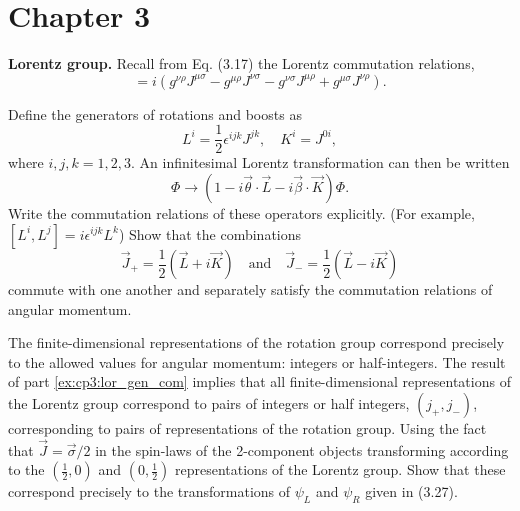 \section{Chapter 3}

\setcounter{equation}{150}
\problem \textbf{Lorentz group.} Recall from Eq. (3.17) the Lorentz commutation relations,
\begin{equation*}
    [J^{\mu\nu}, J^{\rho\sigma}] = i(g^{\nu\rho}J^{\mu\sigma} - g^{\mu\rho}J^{\nu\sigma} - g^{\nu\sigma}J^{\mu\rho} + g^{\mu\sigma}J^{\nu\rho}).
\end{equation*}
\begin{problembody}
    \item \label{ex:cp3:lor_gen_com} 
    Define the generators of rotations and boosts as
    \begin{equation*}
        L^i = \frac{1}{2}\epsilon^{ijk} J^{jk}, \quad K^i = J^{0i},
    \end{equation*}
    where $i, j, k = 1, 2, 3$. An infinitesimal Lorentz transformation can then be written
    \begin{equation}\label{equ:cp2:infsm_lor_trans}
        \Phi \to \left(1 - i\vec{\theta}\cdot\vec{L} - i\vec{\beta}\cdot\vec{K}\right)\Phi.
    \end{equation}
    Write the commutation relations of these operators explicitly. (For example, $[L^i, L^j] = i\epsilon^{ijk}L^k$)
    Show that the combinations 
    \begin{equation*}
        \vec{J}_{+} = \frac{1}{2} \left(\vec{L} + i\vec{K}\right) \quad \text{and} 
        \quad \vec{J}_{-} = \frac{1}{2} \left(\vec{L} - i\vec{K}\right)
    \end{equation*} 
    commute with one another and separately satisfy the commutation relations of angular momentum.

    \item The finite-dimensional representations of the rotation group correspond precisely to the allowed values for 
    angular momentum: integers or half-integers. The result of part \ref{ex:cp3:lor_gen_com} implies that all finite-dimensional
    representations of the Lorentz group correspond to pairs of integers or half integers, $(j_+, j_-)$, corresponding to pairs 
    of representations of the rotation group. Using the fact that $\vec{J} = \vec{\sigma} / 2$ in the spin-laws of the 2-component
    objects transforming according to the $(\frac{1}{2}, 0)$ and $(0, \frac{1}{2})$ representations of the Lorentz group. Show 
    that these correspond precisely to the transformations of $\psi_L$ and $\psi_R$ given in (3.27).


\end{problembody}

